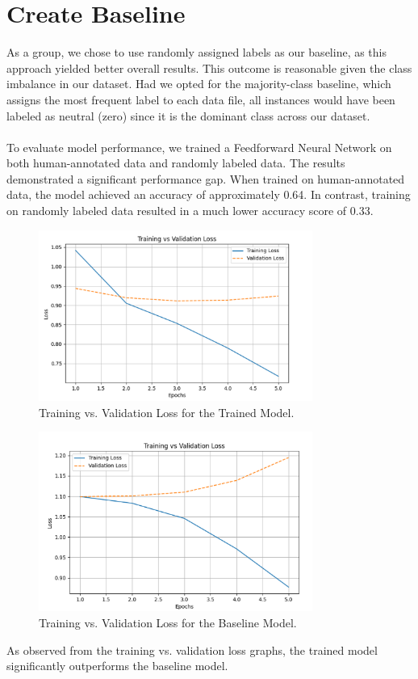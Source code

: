 \documentclass{article}
\begin{document}
\section*{Create Baseline}
As a group, we chose to use randomly assigned labels as our baseline, as this approach yielded better overall results. This outcome is reasonable given the class imbalance in our dataset. Had we opted for the majority-class baseline, which assigns the most frequent label to each data file, all instances would have been labeled as neutral (zero) since it is the dominant class across our dataset. \\ \\
\noindent
To evaluate model performance, we trained a Feedforward Neural Network on both human-annotated data and randomly labeled data. The results demonstrated a significant performance gap. When trained on human-annotated data, the model achieved an accuracy of approximately 0.64. In contrast, training on randomly labeled data resulted in a much lower accuracy score of 0.33.
\FloatBarrier
\begin{figure}[h]
    \centering
    \includegraphics[width=0.8\textwidth]{model.png}
    \caption{Training vs. Validation Loss for the Trained Model.}
    \label{fig:trained_model}
\end{figure}

\begin{figure}[h]
    \centering
    \includegraphics[width=0.8\textwidth]{baseline.png}
    \caption{Training vs. Validation Loss for the Baseline Model.}
    \label{fig:baseline_model}
\end{figure}
\FloatBarrier
\noindent
As observed from the training vs. validation loss graphs, the trained model significantly outperforms the baseline model.
\end{document}
